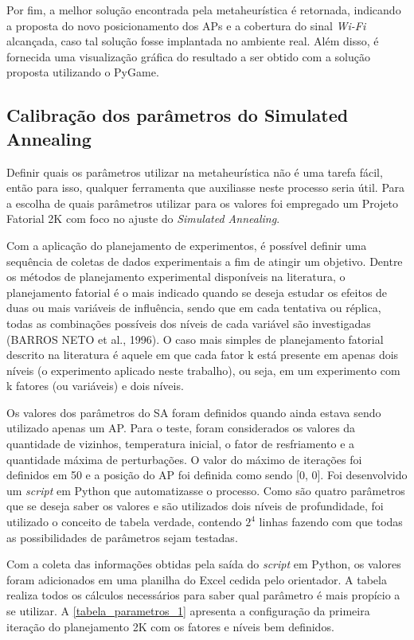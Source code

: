 \documentclass[
	12pt,				%
	openright,			%
	twoside,			%
	a4paper,			%
	english,			%
	french,				%
	spanish,			%
	brazil				%
	]{abntex2}
\begin{document}
Por fim, a melhor solução encontrada pela metaheurística é retornada, indicando a proposta do novo posicionamento dos APs e a cobertura do sinal \textit{Wi-Fi} alcançada, caso tal solução fosse implantada no ambiente real. Além disso, é fornecida uma visualização gráfica do resultado a ser obtido com a solução proposta utilizando o PyGame.

\subsection[Calibração dos parâmetros do Simulated Annealing]{Calibração dos parâmetros do Simulated Annealing}

Definir quais os parâmetros utilizar na metaheurística não é uma tarefa fácil, então para isso, qualquer ferramenta que auxiliasse neste processo seria útil. Para a escolha de quais parâmetros utilizar para os valores foi empregado um Projeto Fatorial 2K com foco no ajuste do \textit{Simulated Annealing}. 

Com a aplicação do planejamento de experimentos, é possível definir uma sequência de coletas de dados experimentais a fim de atingir um objetivo. Dentre os métodos de planejamento experimental disponíveis na literatura, o planejamento fatorial  é o mais indicado quando se deseja estudar os efeitos de duas ou mais variáveis de influência, sendo que em cada tentativa ou réplica, todas as combinações possíveis dos níveis de cada variável são investigadas (BARROS NETO et al., 1996). O caso mais simples de planejamento fatorial descrito na literatura é aquele em que cada fator k está presente em apenas dois níveis (o experimento aplicado neste trabalho), ou seja, em um experimento com k fatores (ou variáveis) e dois níveis.

Os valores dos parâmetros do SA foram definidos quando ainda estava sendo utilizado apenas um AP. Para o teste, foram considerados os valores da quantidade de vizinhos, temperatura inicial, o fator de resfriamento e a quantidade máxima de perturbações. O valor do máximo de iterações foi definidos em 50 e a posição do AP foi definida como sendo [0, 0]. Foi desenvolvido um \textit{script} em Python que automatizasse o processo. Como são quatro parâmetros que se deseja saber os valores e são utilizados dois níveis de profundidade, foi utilizado o conceito de tabela verdade, contendo $ 2^{4} $ linhas fazendo com que todas as possibilidades de parâmetros sejam testadas.

Com a coleta das informações obtidas pela saída do \textit{script} em Python, os valores foram adicionados em uma planilha do Excel cedida pelo orientador. A tabela realiza todos os cálculos necessários para saber qual parâmetro é mais propício a se utilizar. A \autoref{tabela_parametros_1} apresenta a configuração da primeira iteração do planejamento 2K com os fatores e níveis bem definidos.
	
\end{document}
